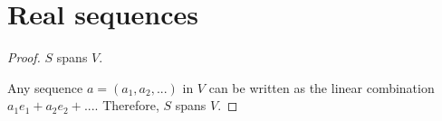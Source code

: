 \section{Real sequences}
\begin{proof}$S$ spans $V$. \gap

    Any sequence $a=(a_1,a_2,...)$ in $V$ can be written as the linear combination
    $a_1e_1 + a_2e_2+...$. Therefore, $S$ spans $V$.
\end{proof}